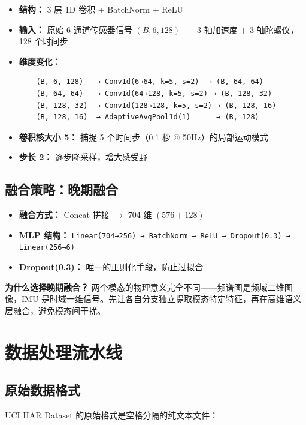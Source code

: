 \documentclass[12pt,a4paper]{ctexart}
\newcommand{\code}[1]{\texttt{#1}}
\begin{document}
\begin{itemize}
    \item \textbf{结构：} 3 层 1D 卷积 + BatchNorm + ReLU
    \item \textbf{输入：} 原始 6 通道传感器信号 $(B, 6, 128)$——3 轴加速度 + 3 轴陀螺仪，128 个时间步
    \item \textbf{维度变化：}
    \begin{verbatim}
    (B, 6, 128)   → Conv1d(6→64, k=5, s=2)  → (B, 64, 64)
    (B, 64, 64)   → Conv1d(64→128, k=5, s=2) → (B, 128, 32)
    (B, 128, 32)  → Conv1d(128→128, k=5, s=2) → (B, 128, 16)
    (B, 128, 16)  → AdaptiveAvgPool1d(1)      → (B, 128)
    \end{verbatim}
    \item \textbf{卷积核大小 5：} 捕捉 5 个时间步（0.1 秒 @ 50Hz）的局部运动模式
    \item \textbf{步长 2：} 逐步降采样，增大感受野
\end{itemize}

\subsection{融合策略：晚期融合}

\begin{itemize}
    \item \textbf{融合方式：} Concat 拼接 $\rightarrow$ 704 维 $(576 + 128)$
    \item \textbf{MLP 结构：} \code{Linear(704→256) → BatchNorm → ReLU → Dropout(0.3) → Linear(256→6)}
    \item \textbf{Dropout(0.3)：} 唯一的正则化手段，防止过拟合
\end{itemize}

\textbf{为什么选择晚期融合？} 两个模态的物理意义完全不同——频谱图是频域二维图像，IMU 是时域一维信号。先让各自分支独立提取模态特定特征，再在高维语义层融合，避免模态间干扰。

\section{数据处理流水线}

\subsection{原始数据格式}

UCI HAR Dataset 的原始格式是空格分隔的纯文本文件：
\end{document}
